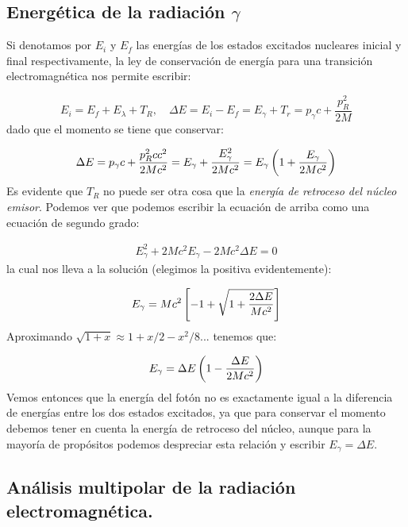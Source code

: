 \subsection{Energética de la radiación $\gamma$}

Si denotamos por $E_i$ y $E_f$ las energías de los estados excitados nucleares inicial y final respectivamente, la ley de conservación de energía para una transición electromagnética nos permite escribir:

\begin{equation*}
	E_i = E_f + E_\lambda + T_R, \quad \Delta E = E_i - E_f = E_\gamma + T_r = p_\gamma c+ \frac{p^2_R}{2M}  
\end{equation*}
dado que el momento se tiene que conservar:

\begin{equation*}
	\Delta E = p_\gamma c+ \frac{p^2_Rc c^2}{2Mc^2} =E_\gamma + \frac{E_\gamma^2}{2Mc^2} = E_\gamma \left( 1+\frac{E_\gamma}{2Mc^2} \right)
\end{equation*}
Es evidente que $T_R$ no puede ser otra cosa que la \textit{energía de retroceso del núcleo emisor}. Podemos ver que podemos escribir la ecuación de arriba como una ecuación de segundo grado:

\begin{eqnarray*}
	E_\gamma^2 +2 Mc^2 E_\gamma - 2Mc^2 \Delta E = 0 
\end{eqnarray*}
la cual nos  lleva a la solución (elegimos la positiva evidentemente):

\begin{equation}
	E_\gamma = Mc^2 \left[ -1+\sqrt{1+\frac{2\Delta E}{Mc^2}} \right]
\end{equation}
Aproximando $\sqrt{1+x} \approx 1+x/2-x^2/8...$ tenemos que:

\begin{equation}
	E_\gamma = \Delta E \left( 1-\frac{\Delta E}{2Mc^2} \right)
\end{equation}
Vemos entonces que la energía del fotón no es exactamente igual a la diferencia de energías entre los dos estados excitados, ya que para conservar el momento debemos tener en cuenta la energía de retroceso del núcleo, aunque para la mayoría de propósitos podemos despreciar esta relación y escribir $E_\gamma = \Delta  E$.

\subsection{Análisis multipolar de la radiación electromagnética.}

